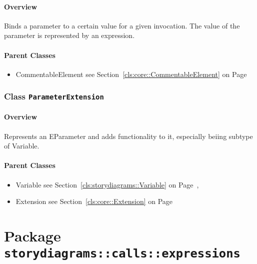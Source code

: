 \paragraph{Overview}

	
			
Binds a parameter to a certain value for a given invocation. The value of the parameter is represented by an expression.	
		
	



\paragraph{Parent Classes}
\begin{itemize}
\item CommentableElement see Section~\ref{cls:core::CommentableElement} on Page~\pageref{cls:core::CommentableElement}\end{itemize}
\subsubsection{\Large{Class \bfseries \texttt{ParameterExtension}\normalfont}}
\label{cls:storydiagrams::calls::ParameterExtension} 
\paragraph{Overview}

	
			
Represents an EParameter and adds functionality to it, especially beiing subtype of Variable.	
		
	



\paragraph{Parent Classes}
\begin{itemize}
\item Variable see Section~\ref{cls:storydiagrams::Variable} on Page~\pageref{cls:storydiagrams::Variable}, \item Extension see Section~\ref{cls:core::Extension} on Page~\pageref{cls:core::Extension}\end{itemize}
\newpage
		


\section{Package \bfseries \texttt{storydiagrams::calls::expressions}\normalfont}
